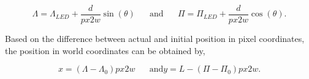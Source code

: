 \begin{equation}
    \Lambda = \Lambda_{LED} + \frac{d}{px2w} \sin(\theta) \hspace{20pt} \text{and}  \hspace{20pt}  \Pi = \Pi_{LED} + \frac{d}{px2w} \cos(\theta).
\end{equation}

Based on the difference between actual and initial position in pixel coordinates, the position in world coordinates can be obtained by, 

\begin{equation}
    x = (\Lambda-\Lambda_0)px2w \hspace{20pt} \text{and} y = L - (\Pi - \Pi_0)px2w. 
\end{equation}

